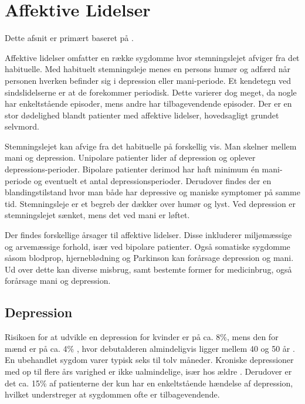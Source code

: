 
\section{Affektive Lidelser}\label{sec:affektivelidelser}
Dette afsnit er primært baseret på \citet{misc:affektivelidelser, misc:netpsykdepression, misc:netpsykmani}.

Affektive lidelser omfatter en række sygdomme hvor stemningslejet afviger fra det habituelle.
Med habituelt stemningsleje menes en persons humør og adfærd når personen hverken befinder sig i depression eller mani-periode.
Et kendetegn ved sindslidelserne er at de forekommer periodisk.
Dette varierer dog meget, da nogle har enkeltstående episoder, mens andre har tilbagevendende episoder.
Der er en stor dødelighed blandt patienter med affektive lidelser, hovedsagligt grundet selvmord.

Stemningslejet kan afvige fra det habituelle på forskellig vis.
Man skelner mellem mani og depression.
Unipolare patienter lider af depression og oplever depressions-perioder.
Bipolare patienter derimod har haft minimum én mani-periode og eventuelt et antal depressionsperioder.
Derudover findes der en blandingstilstand hvor man både har depressive og maniske symptomer på samme tid.
Stemningsleje er et begreb der dækker over humør og lyst.
Ved depression er stemningslejet sænket, mens det ved mani er løftet.

Der findes forskellige årsager til affektive lidelser. 
Disse inkluderer miljømæssige og arvemæssige forhold, især ved bipolare patienter.
Også somatiske sygdomme såsom blodprop, hjerneblødning og Parkinson kan forårsage depression og mani.
Ud over dette kan diverse misbrug, samt bestemte former for medicinbrug, også forårsage mani og depression.

\subsection{Depression}
Risikoen for at udvikle en depression for kvinder er på ca. 8\%, mens den for mænd er på ca. 4\% \citep{misc:affektivelidelser}, hvor debutalderen almindeligvis ligger mellem 40 og 50 år \citep{misc:affektivelidelser}.
En ubehandlet sygdom varer typisk seks til tolv måneder.
Kroniske depressioner med op til flere års varighed er ikke ualmindelige, især hos ældre \citep{misc:affektivelidelser}.
Derudover er det ca. 15\% af patienterne der kun har en enkeltstående hændelse af depression, hvilket understreger at sygdommen ofte er tilbagevendende.

